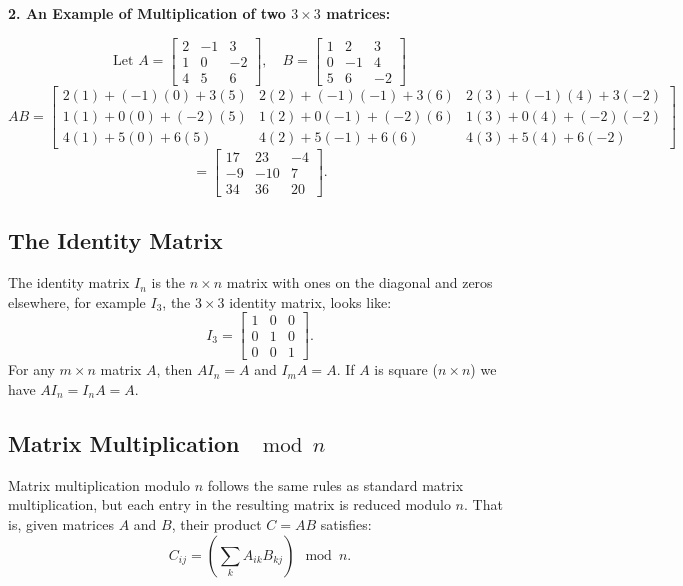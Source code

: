\newpage 
\noindent \textbf{2. An Example of Multiplication of two $ 3 \times 3 $ matrices:}

\[
    \text{Let } A = \begin{bmatrix} 2 & -1 & 3 \\ 1 & 0 & -2 \\ 4 & 5 & 6 \end{bmatrix}, \quad
B = \begin{bmatrix} 1 & 2 & 3 \\ 0 & -1 & 4 \\ 5 & 6 & -2 \end{bmatrix}
\]
\[
AB = \begin{bmatrix} 
2(1) + (-1)(0) + 3(5) & 2(2) + (-1)(-1) + 3(6) & 2(3) + (-1)(4) + 3(-2) \\ 
1(1) + 0(0) + (-2)(5) & 1(2) + 0(-1) + (-2)(6) & 1(3) + 0(4) + (-2)(-2) \\ 
4(1) + 5(0) + 6(5) & 4(2) + 5(-1) + 6(6) & 4(3) + 5(4) + 6(-2)
\end{bmatrix}
\]
\[
= \begin{bmatrix} 17 & 23 & -4 \\ -9 & -10 & 7 \\ 34 & 36 & 20 \end{bmatrix}.
\]

\subsection{The Identity Matrix}

The identity matrix $ I_n $ is the $ n \times n $ matrix with ones on the diagonal and zeros elsewhere, for example $I_3$, the $3\times 3$ identity matrix, looks like:
\[
I_3 = \begin{bmatrix} 1 & 0 & 0 \\ 0 & 1 & 0 \\ 0 & 0 & 1 \end{bmatrix}.
\]
For any $m \times n$ matrix $ A $, then $ A I_n = A $ and $ I_m A = A $. If $A$ is square ($n\times n$) we have $AI_n =I_nA = A$.

\subsection{Matrix Multiplication $\mod n $}

Matrix multiplication modulo $ n $ follows the same rules as standard matrix multiplication, but each entry in the resulting matrix is reduced modulo $ n $. That is, given matrices $ A $ and $ B $, their product $ C = AB $ satisfies:
\[
C_{ij} = \left( \sum_{k} A_{ik} B_{kj} \right) \mod n.
\]

